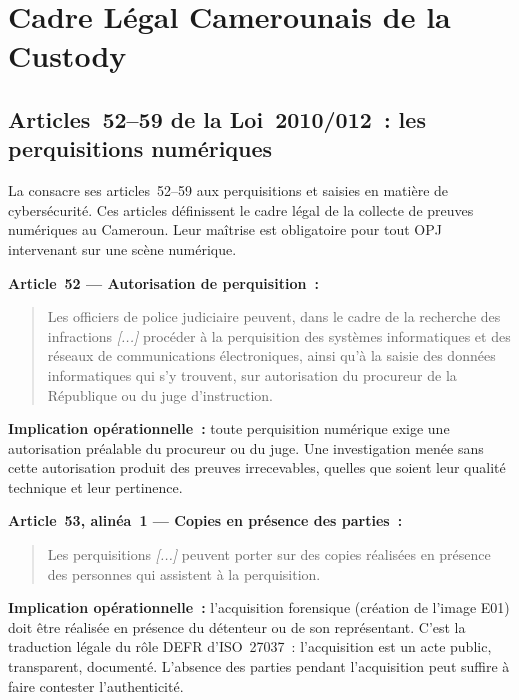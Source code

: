 \section{Cadre Légal Camerounais de la Custody}
\label{sec:custody-legal}

\subsection{Articles~52--59 de la Loi~2010/012~: les perquisitions numériques}

La  consacre ses articles~52--59 aux perquisitions et saisies
en matière de cybersécurité. Ces articles définissent le cadre légal de la
collecte de preuves numériques au Cameroun. Leur maîtrise est obligatoire
pour tout OPJ intervenant sur une scène numérique.

\begin{boxjuris}
\textbf{Article~52 --- Autorisation de perquisition~:}
\begin{quote}
Les officiers de police judiciaire peuvent, dans le cadre de la recherche des
infractions \textit{[...]} procéder à la perquisition des systèmes informatiques
et des réseaux de communications électroniques, ainsi qu'à la saisie des données
informatiques qui s'y trouvent, sur autorisation du procureur de la République
ou du juge d'instruction.
\end{quote}
\textbf{Implication opérationnelle~:} toute perquisition numérique exige une
autorisation préalable du procureur ou du juge. Une investigation menée sans
cette autorisation produit des preuves irrecevables, quelles que soient leur
qualité technique et leur pertinence.
\end{boxjuris}

\begin{boxjuris}
\textbf{Article~53, alinéa~1 --- Copies en présence des parties~:}
\begin{quote}
Les perquisitions \textit{[...]} peuvent porter sur des copies réalisées en
présence des personnes qui assistent à la perquisition.
\end{quote}
\textbf{Implication opérationnelle~:} l'acquisition forensique (création de
l'image E01) doit être réalisée en présence du détenteur ou de son représentant.
C'est la traduction légale du rôle DEFR d'ISO~27037~: l'acquisition est un
acte public, transparent, documenté. L'absence des parties pendant l'acquisition
peut suffire à faire contester l'authenticité.
\end{boxjuris}


